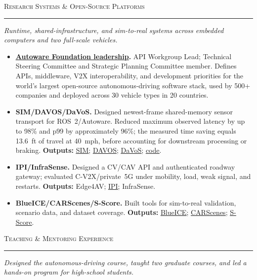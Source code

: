 \documentclass[11pt]{article}
\let\cvplainhref\href
\renewcommand{\href}[2]{\cvplainhref{#1}{\uline{#2}}}
\newcommand{\cvsection}[1]{%
  \Needspace{5\baselineskip}%
  \vspace{0.62em}%
  {\large\scshape #1}\par
  \vspace{0.12em}\hrule\vspace{0.32em}
}
\newcommand{\cvsummary}[1]{%
  {\itshape #1}\par
  \vspace{0.18em}
}
\begin{document}
\cvsection{Research Systems \& Open-Source Platforms}
\cvsummary{Runtime, shared-infrastructure, and sim-to-real systems across embedded computers
and two full-scale vehicles.}
\begin{itemize}
    \item \textbf{\href{https://autoware.org/about/why-autoware/}{Autoware Foundation leadership}.} API Workgroup Lead; Technical Steering Committee and Strategic Planning Committee member. Defines APIs, middleware, V2X interoperability, and development priorities for the world's largest open-source autonomous-driving software stack, used by 500+ companies and deployed across 30 vehicle types in 20 countries.
    \item \textbf{SIM/DAVOS/DaVoS.} Designed newest-frame shared-memory sensor transport for ROS~2/Autoware. Reduced maximum observed latency by up to 98\% and p99 by approximately 96\%; the measured time saving equals 13.6~ft of travel at 40~mph, before accounting for downstream processing or braking. \textbf{Outputs:} \href{https://arxiv.org/abs/2510.11448}{SIM}; \href{https://arxiv.org/abs/2601.05072}{DAVOS}; \href{https://doi.org/10.1109/MOST69733.2026.00043}{DaVoS}; \href{https://github.com/Croquembouche/DAVOS_SIM}{code}.
    \item \textbf{IPI/InfraSense.} Designed a CV/CAV API and authenticated roadway gateway; evaluated C-V2X/\allowbreak private~5G under mobility, load, weak signal, and restarts. \textbf{Outputs:} Edge4AV; \href{https://github.com/Croquembouche/IPI}{IPI}; InfraSense.
    \item \textbf{BlueICE/CARScenes/S-Score.} Built tools for sim-to-real validation, scenario data, and dataset coverage. \textbf{Outputs:} \href{https://arxiv.org/abs/2405.01328}{BlueICE}; \href{https://arxiv.org/abs/2511.10701}{CARScenes}; \href{https://weisongshi.org/papers/he26-udrive.pdf}{S-Score}.
\end{itemize}

\cvsection{Teaching \& Mentoring Experience}
\cvsummary{Designed the autonomous-driving course, taught two graduate courses, and led a hands-on program
for high-school students.}
\end{document}
